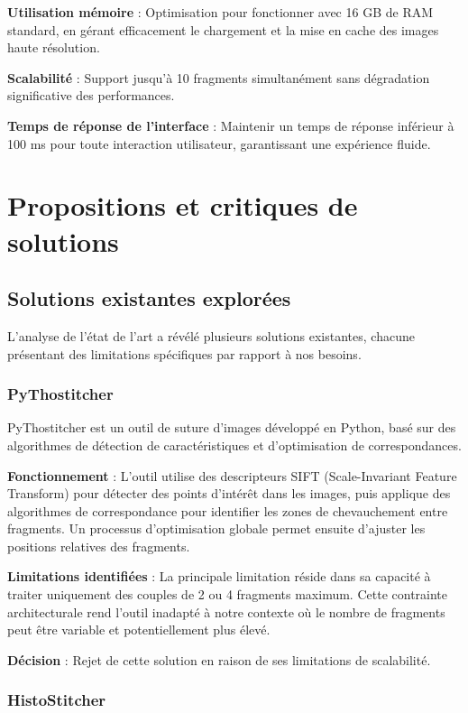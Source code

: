 \documentclass[12pt,a4paper]{report}
\begin{document}
\textbf{Utilisation mémoire} : Optimisation pour fonctionner avec 16 GB de RAM standard, en gérant efficacement le chargement et la mise en cache des images haute résolution.

\textbf{Scalabilité} : Support jusqu'à 10 fragments simultanément sans dégradation significative des performances.

\textbf{Temps de réponse de l'interface} : Maintenir un temps de réponse inférieur à 100 ms pour toute interaction utilisateur, garantissant une expérience fluide.

\section{Propositions et critiques de solutions}

\subsection{Solutions existantes explorées}

L'analyse de l'état de l'art a révélé plusieurs solutions existantes, chacune présentant des limitations spécifiques par rapport à nos besoins.

\subsubsection{PyThostitcher}

PyThostitcher est un outil de suture d'images développé en Python, basé sur des algorithmes de détection de caractéristiques et d'optimisation de correspondances.

\textbf{Fonctionnement} : L'outil utilise des descripteurs SIFT (Scale-Invariant Feature Transform) pour détecter des points d'intérêt dans les images, puis applique des algorithmes de correspondance pour identifier les zones de chevauchement entre fragments. Un processus d'optimisation globale permet ensuite d'ajuster les positions relatives des fragments.

\textbf{Limitations identifiées} : La principale limitation réside dans sa capacité à traiter uniquement des couples de 2 ou 4 fragments maximum. Cette contrainte architecturale rend l'outil inadapté à notre contexte où le nombre de fragments peut être variable et potentiellement plus élevé.

\textbf{Décision} : Rejet de cette solution en raison de ses limitations de scalabilité.

\subsubsection{HistoStitcher}
\end{document}
